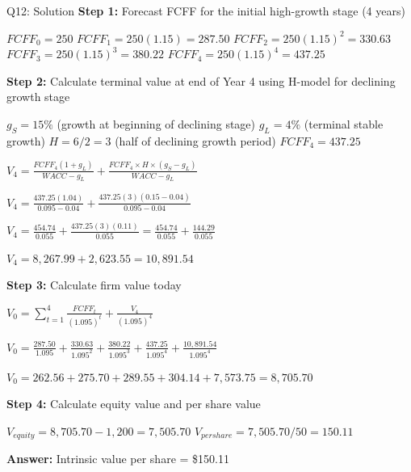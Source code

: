 \documentclass{beamer}
\renewcommand{\scriptsize}{\fontsize{6pt}{7pt}\selectfont}
\begin{document}
	\begin{frame}{Q12: Solution}
		\scriptsize
		\textbf{Step 1:} Forecast FCFF for the initial high-growth stage (4 years)
		
		$FCFF_0 = 250$
		$FCFF_1 = 250(1.15) = 287.50$
		$FCFF_2 = 250(1.15)^2 = 330.63$
		$FCFF_3 = 250(1.15)^3 = 380.22$
		$FCFF_4 = 250(1.15)^4 = 437.25$
		
		\vspace{2pt}
		\textbf{Step 2:} Calculate terminal value at end of Year 4 using H-model for declining growth stage
		
		$g_S = 15\%$ (growth at beginning of declining stage)
		$g_L = 4\%$ (terminal stable growth)
		$H = 6/2 = 3$ (half of declining growth period)
		$FCFF_4 = 437.25$
		
		\vspace{2pt}
		$V_4 = \frac{FCFF_4(1+g_L)}{WACC-g_L} + \frac{FCFF_4 \times H \times (g_S-g_L)}{WACC-g_L}$
		
		$V_4 = \frac{437.25(1.04)}{0.095-0.04} + \frac{437.25(3)(0.15-0.04)}{0.095-0.04}$
		
		$V_4 = \frac{454.74}{0.055} + \frac{437.25(3)(0.11)}{0.055} = \frac{454.74}{0.055} + \frac{144.29}{0.055}$
		
		$V_4 = 8,267.99 + 2,623.55 = 10,891.54$
		
		\vspace{2pt}
		\textbf{Step 3:} Calculate firm value today
		
		$V_0 = \sum_{t=1}^{4} \frac{FCFF_t}{(1.095)^t} + \frac{V_4}{(1.095)^4}$
		
		$V_0 = \frac{287.50}{1.095} + \frac{330.63}{1.095^2} + \frac{380.22}{1.095^3} + \frac{437.25}{1.095^4} + \frac{10,891.54}{1.095^4}$
		
		$V_0 = 262.56 + 275.70 + 289.55 + 304.14 + 7,573.75 = 8,705.70$
		
		\vspace{2pt}
		\textbf{Step 4:} Calculate equity value and per share value
		
		$V_{equity} = 8,705.70 - 1,200 = 7,505.70$
		$V_{per share} = 7,505.70/50 = 150.11$
		
		\textbf{Answer:} Intrinsic value per share = \$150.11
	\end{frame}
	
\end{document}
